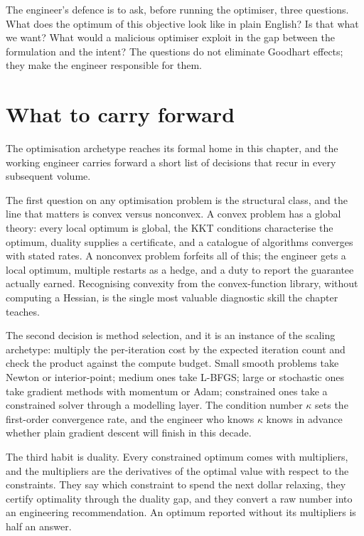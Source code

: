 The engineer's defence is to ask, before running the optimiser,
three questions. What does the optimum of this objective look
like in plain English? Is that what we want? What would a
malicious optimiser exploit in the gap between the formulation
and the intent? The questions do not eliminate Goodhart effects;
they make the engineer responsible for them.

\section{What to carry forward}

The optimisation archetype reaches its formal home in this
chapter, and the working engineer carries forward a short list of
decisions that recur in every subsequent volume.

The first question on any optimisation problem is the structural
class, and the line that matters is convex versus nonconvex. A
convex problem has a global theory: every local optimum is global,
the KKT conditions characterise the optimum, duality supplies a
certificate, and a catalogue of algorithms converges with stated
rates. A nonconvex problem forfeits all of this; the engineer gets
a local optimum, multiple restarts as a hedge, and a duty to
report the guarantee actually earned. Recognising convexity from
the convex-function library, without computing a Hessian, is the
single most valuable diagnostic skill the chapter teaches.

The second decision is method selection, and it is an instance of
the scaling archetype: multiply the per-iteration cost by the
expected iteration count and check the product against the compute
budget. Small smooth problems take Newton or interior-point;
medium ones take L-BFGS; large or stochastic ones take gradient
methods with momentum or Adam; constrained ones take a constrained
solver through a modelling layer. The condition number $\kappa$
sets the first-order convergence rate, and the engineer who knows
$\kappa$ knows in advance whether plain gradient descent will
finish in this decade.

The third habit is duality. Every constrained optimum comes with
multipliers, and the multipliers are the derivatives of the
optimal value with respect to the constraints. They say which
constraint to spend the next dollar relaxing, they certify
optimality through the duality gap, and they convert a raw number
into an engineering recommendation. An optimum reported without its
multipliers is half an answer.


